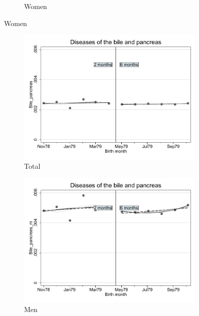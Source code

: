 \documentclass[a4paper ]{article}
\begin{document}
\begin{figure}[h!]
\begin{subfigure}[t]{0.31\textwidth}
		\caption{Women}
	\end{subfigure}
\end{figure}
\newpage
\begin{figure}[h]
	\centering
	\begin{subfigure}[t]{0.31\textwidth}
		\centering
		\includegraphics[width=0.99\textwidth]{R1_RD_Bile_pancreas_fits}
		\caption{Total}		
	\end{subfigure}
	\begin{subfigure}[t]{0.31\textwidth}
		\centering
		\includegraphics[width=0.99\textwidth]{R1_RD_Bile_pancreas_m_fits}
		\caption{Men}		
	\end{subfigure}
	\quad
	\begin{subfigure}[t]{0.31\textwidth}

\end{subfigure}
\end{figure}
\end{document}

